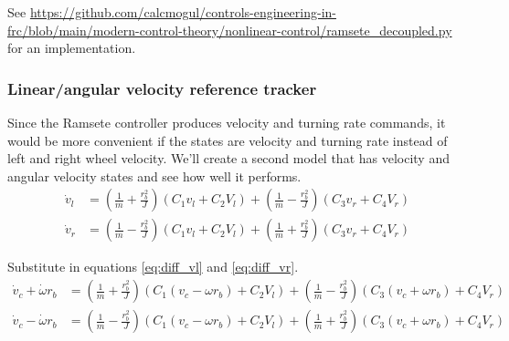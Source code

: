 See
\url{https://github.com/calcmogul/controls-engineering-in-frc/blob/main/modern-control-theory/nonlinear-control/ramsete_decoupled.py}
for an implementation.

\subsubsection{Linear/angular velocity reference tracker}

Since the Ramsete controller produces velocity and turning rate commands, it
would be more convenient if the \glspl{state} are velocity and turning rate
instead of left and right wheel velocity. We'll create a second model that has
velocity and angular velocity states and see how well it performs.
\begin{align*}
  \dot{v}_l &= \left(\frac{1}{m} + \frac{r_b^2}{J}\right)
    \left(C_1 v_l + C_2 V_l\right) +
    \left(\frac{1}{m} - \frac{r_b^2}{J}\right) \left(C_3 v_r + C_4 V_r\right) \\
  \dot{v}_r &= \left(\frac{1}{m} - \frac{r_b^2}{J}\right)
    \left(C_1 v_l + C_2 V_l\right) +
    \left(\frac{1}{m} + \frac{r_b^2}{J}\right) \left(C_3 v_r + C_4 V_r\right)
\end{align*}

Substitute in equations \eqref{eq:diff_vl} and \eqref{eq:diff_vr}.
\begin{align}
  \dot{v}_c + \dot{\omega} r_b &= \left(\frac{1}{m} + \frac{r_b^2}{J}\right)
    \left(C_1(v_c - \omega r_b) + C_2 V_l\right) +
    \left(\frac{1}{m} - \frac{r_b^2}{J}\right) \left(C_3(v_c + \omega r_b) +
      C_4 V_r\right) \label{eq:diff_vc_l} \\
  \dot{v}_c - \dot{\omega} r_b &= \left(\frac{1}{m} - \frac{r_b^2}{J}\right)
    \left(C_1(v_c - \omega r_b) + C_2 V_l\right) +
    \left(\frac{1}{m} + \frac{r_b^2}{J}\right) \left(C_3(v_c + \omega r_b) +
      C_4 V_r\right) \label{eq:diff_vc_r}
\end{align}

